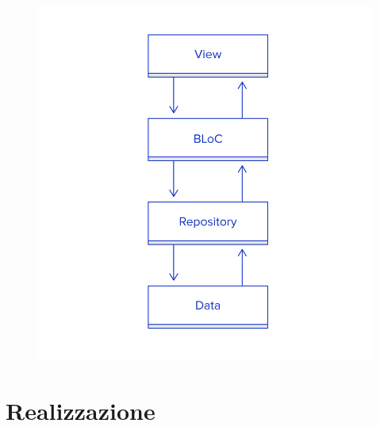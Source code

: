 \documentclass[12pt,italian,oneside]{report}
\newcounter{cap}
\begin{document}
\begin{firstheadlineitemize}
\begin{figure}[htp]
\begin{minipage}[b]{.3\columnwidth}
\begin{secondheadlineitemize}
\end{secondheadlineitemize}
\end{minipage}
\begin{minipage}[b]{.5\columnwidth}
  \begin{center}
\includegraphics[scale=0.4]{architettura_implementata}
\end{center}
\end{minipage}\hspace*{\fill}
\end{figure}

\end{firstheadlineitemize}

\newpage

\section{Realizzazione}
\end{document}

